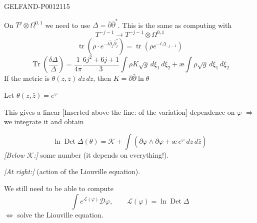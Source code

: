 \begin{GelfandAdjacentEvidence}{GELFAND-P001211}{5}


On \(T^j\otimes\Omega^{0,1}\) we need to use \(\Delta=\bar\partial\bar\partial^*\).
This is the same as computing with
\[
T^{-j-1}\longrightarrow T^{-j-1}\otimes\Omega^{0,1}
\]
\[
\operatorname{tr}(\rho\cdot e^{-t\bar\partial_j\bar\partial_j^*})
=\operatorname{tr}(\rho e^{-t\Delta_{-j-1}})
\]
\[
\operatorname{Tr}\left(\frac{\delta\Delta}{\Delta}\right)
=\frac1{4\pi}\frac{6j^2+6j+1}{3}
\int\rho K\sqrt g\,d\xi_1\,d\xi_2
+\text{\ae}\int\rho\sqrt g\,d\xi_1\,d\xi_2
\]
If the metric is \(\theta(z,\bar z)\,dz\,d\bar z\), then \(K=\partial\bar\partial\ln\theta\)

Let \(\theta(z,\bar z)=e^\varphi\)

This gives a linear [Inserted above the line: of the variation] dependence on \(\varphi\)
\(\Rightarrow\) we integrate it and obtain
\end{GelfandAdjacentEvidence}

\[
\ln\operatorname{Det}\Delta(\theta)=\mathcal K+
\int\left(\partial\varphi\wedge\bar\partial\varphi+\text{\ae}\,e^\varphi\,dz\,d\bar z\right)
\]
\textit{[Below \(\mathcal K\):]} some number (it depends on everything!).

\textit{[At right:]} (action of the Liouville equation).

We still need to be able to compute
\[
\int e^{\mathcal L(\varphi)}\mathcal D\varphi,\qquad
\mathcal L(\varphi)=\ln\operatorname{Det}\Delta
\]
\(\Leftrightarrow\) solve the Liouville equation.


